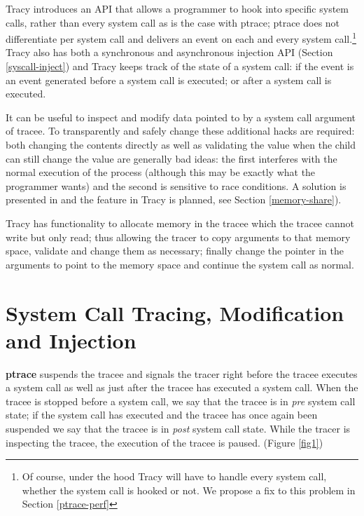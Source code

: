 \documentclass[a4paper, 10pt]{report}
\begin{document}
Tracy introduces an API that allows a programmer to hook into specific system
calls, rather than every system call as is the case with ptrace; ptrace does
not differentiate per system call and delivers an event on each and every
system call.\footnote{Of course, under the hood Tracy will have to handle
    every system call, whether the system call is hooked or not. We propose
    a fix to this problem in Section \ref{ptrace-perf}}
Tracy also has both a synchronous and asynchronous injection API
(Section \ref{syscall-inject}) and Tracy keeps
track of the state of a system call: if the event is an event generated before
a system call is executed; or after a system call is executed.

It can be useful to inspect and modify data pointed to by a system call
argument of tracee.
To transparently and safely change these additional hacks are required:
both changing the contents directly as well as validating the value when the
child can still change the value are generally bad ideas:
the first interferes with the normal execution of the process
(although this may be exactly what the programmer wants) and the second is
sensitive to race conditions. A solution is presented in
\cite{Noordende_asecure} and the feature in Tracy is planned, see Section
\ref{memory-share}).

Tracy has functionality to allocate memory in the tracee which
the tracee cannot write but only read; thus allowing the tracer
to copy arguments to that memory space, validate and change them as
necessary; finally change the pointer in the arguments to point to the memory
space and continue the system call as normal.

\section{System Call Tracing, Modification and Injection}

\textbf{ptrace} suspends the tracee and signals the tracer right before
the tracee executes a system call as well as just after the tracee has
executed a system call. When the tracee is stopped before a system call,
we say that the tracee is in \textit{pre} system call state; if the system
call has executed and the tracee has once again
been suspended we say that the tracee is in \textit{post} system call state.
While the tracer is inspecting the tracee, the execution of the
tracee is paused. (Figure \ref{fig1})
\end{document}
